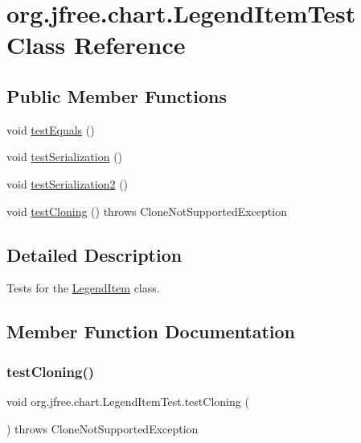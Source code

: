\hypertarget{classorg_1_1jfree_1_1chart_1_1_legend_item_test}{}\section{org.\+jfree.\+chart.\+Legend\+Item\+Test Class Reference}
\label{classorg_1_1jfree_1_1chart_1_1_legend_item_test}
\subsection*{Public Member Functions}
\begin{DoxyCompactItemize}
\item 
void \mbox{\hyperlink{classorg_1_1jfree_1_1chart_1_1_legend_item_test_a8f6b75b48c84bdd848cd0e0af799427d}{test\+Equals}} ()
\item 
void \mbox{\hyperlink{classorg_1_1jfree_1_1chart_1_1_legend_item_test_af4d2c4b200d925a430fda7888fab50d0}{test\+Serialization}} ()
\item 
void \mbox{\hyperlink{classorg_1_1jfree_1_1chart_1_1_legend_item_test_ae2bc6406e82b49090e53e8a856ebb210}{test\+Serialization2}} ()
\item 
void \mbox{\hyperlink{classorg_1_1jfree_1_1chart_1_1_legend_item_test_a74d36483be6898c546a311e9eae2f8fb}{test\+Cloning}} ()  throws Clone\+Not\+Supported\+Exception 
\end{DoxyCompactItemize}


\subsection{Detailed Description}
Tests for the \mbox{\hyperlink{classorg_1_1jfree_1_1chart_1_1_legend_item}{Legend\+Item}} class. 

\subsection{Member Function Documentation}
\mbox{\label{classorg_1_1jfree_1_1chart_1_1_legend_item_test_a74d36483be6898c546a311e9eae2f8fb}} 
\subsubsection{\texorpdfstring{test\+Cloning()}{testCloning()}}
{\footnotesize\ttfamily void org.\+jfree.\+chart.\+Legend\+Item\+Test.\+test\+Cloning (\begin{DoxyParamCaption}{ }\end{DoxyParamCaption}) throws Clone\+Not\+Supported\+Exception}

